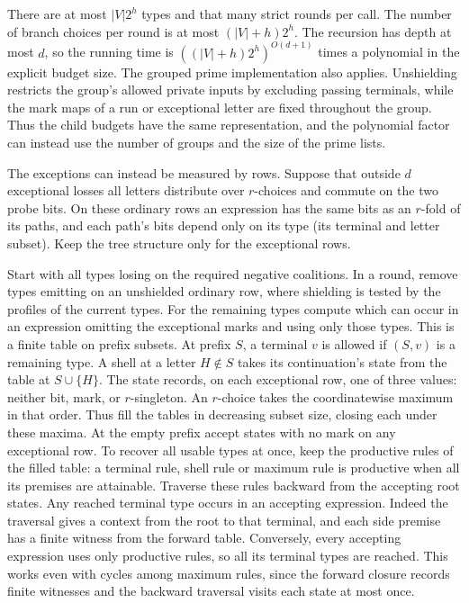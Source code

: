 There are at most $|V|2^h$ types and that many strict
rounds per call. The number of branch choices per
round is at most $(|V|+h)2^h$. The recursion has
depth at most $d$, so the running time is
$((|V|+h)2^h)^{O(d+1)}$ times a polynomial in the
explicit budget size. The grouped prime implementation
also applies. Unshielding restricts the group's allowed
private inputs by excluding passing terminals, while
the mark maps of a run or exceptional letter are fixed
throughout the group. Thus the child budgets have the
same representation, and the polynomial factor can
instead use the number of groups and the size of the
prime lists.

The exceptions can instead be measured by rows. Suppose
that outside $d$ exceptional losses all letters distribute
over $r$-choices and commute on the two probe bits. On
these ordinary rows an expression has the same bits as an
$r$-fold of its paths, and each path's bits depend only on
its type (its terminal and letter subset). Keep the tree
structure only for the exceptional rows.

Start with all types losing on the required negative
coalitions. In a round, remove types emitting on an
unshielded ordinary row, where shielding is tested by
the profiles of the current types. For the remaining
types compute which can occur in an expression omitting
the exceptional marks and using only those types. This
is a finite table on prefix subsets. At prefix $S$, a
terminal $v$ is allowed if $(S,v)$ is a remaining type.
A shell at a letter $H\notin S$ takes its continuation's
state from the table at $S\cup\{H\}$. The state records,
on each exceptional row, one of three values: neither
bit, mark, or $r$-singleton. An $r$-choice takes the
coordinatewise maximum in that order. Thus fill the
tables in decreasing subset size, closing each under
these maxima. At the empty prefix accept states with no
mark on any exceptional row. To recover all usable
types at once, keep the productive rules of the filled
table: a terminal rule, shell rule or maximum rule is
productive when all its premises are attainable.
Traverse these rules backward from the accepting root
states. Any reached terminal type occurs in an
accepting expression. Indeed the traversal gives
a context from the root to that terminal, and each
side premise has a finite witness from the forward
table. Conversely, every accepting expression uses
only productive rules, so all its terminal types
are reached. This works even with cycles among
maximum rules, since the forward closure records
finite witnesses and the backward traversal visits
each state at most once.

